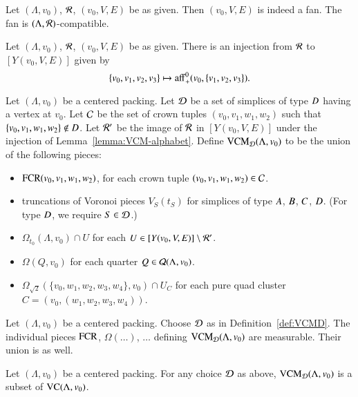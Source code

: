 \begin{lemma}
Let $(\Lambda,v_0)$, ${\mathcal R}$, $(v_0,V,E)$ be as given. Then $(v_0,V,E)$ is indeed a fan.
The fan is $(\Lambda,{\mathcal R})$-compatible.  
\end{lemma}




\begin{lemma}
Let $(\Lambda,v_0)$, ${\mathcal R}$, $(v_0,V,E)$ be as given.  There is an injection from ${\mathcal R}$
to $[Y(v_0,V,E)]$ given by 
  $$
  \{v_0,v_1,v_2,v_3\}\mapsto {\operatorname{aff}}_+^0(v_0,\{v_1,v_2,v_3\}).
  $$
\end{lemma}

\begin{definition}[VCM]
Let $(\Lambda,v_0)$ be  a centered packing.   
Let ${\mathcal D}$ be a set of simplices of type $D$ having a vertex at $v_0$.  Let ${\mathcal C}$ be the
set of crown tuples $(v_0,v_1,w_1,w_2)$ such that $\{v_0,v_1,w_1,w_2\}\not\in D$. 
Let ${\mathcal R}'$ be the image
of ${\mathcal R}$ in $[Y(v_0,V,E)]$ under the injection of Lemma~\ref{lemma:VCM-alphabet}.
Define ${\operatorname{VCM}}_{{\mathcal D}}(\Lambda,v_0)$ to be the union of the following pieces:
    \begin{itemize}
    \item ${\operatorname{FCR}}(v_0,v_1,w_1,w_2)$, for each crown tuple $(v_0,v_1,w_1,w_2)\in{\mathcal C}$.
    \item truncations of Voronoi pieces $V_S(t_S)$ for simplices of type
        $A$, $B$,  $C$, $D$.  (For type $D$, we require $S\in {\mathcal D}$.)
    \item $\Omega_{t_0}(\Lambda,v_0)\cap U$ for each $U\in[Y(v_0,V,E)]\setminus {\mathcal R}'$.
    \item $\Omega(Q,v_0)$ for each quarter $Q\in{\mathcal Q}(\Lambda,v_0)$.
    \item $\Omega_{\sqrt2}(\{v_0,w_1,w_2,w_3,w_4\},v_0)\cap U_C$ 
     for each pure quad
     cluster $C=(v_0,(w_1,w_2,w_3,w_4))$.
    \end{itemize}
\end{definition}

\begin{lemma}
Let $(\Lambda,v_0)$ be a centered packing.  Choose ${\mathcal D}$ as in Definition~\ref{def:VCMD}.  
The individual pieces ${\operatorname{FCR}}$, $\Omega(\ldots)$, $\ldots$ 
defining ${\operatorname{VCM}}_{{\mathcal D}}(\Lambda,v_0)$ are measurable.  Their union is as well.
\end{lemma}

\begin{lemma}
Let $(\Lambda,v_0)$ be a centered packing.
For any choice ${\mathcal D}$ as above,  ${\operatorname{VCM}}_{{\mathcal D}}(\Lambda,v_0)$ is a subset of ${\operatorname{VC}}(\Lambda,v_0)$.
\end{lemma}

